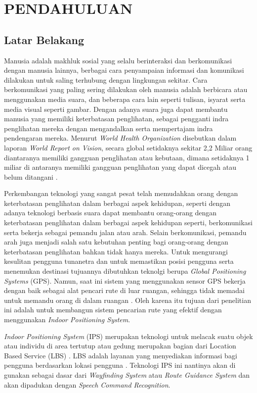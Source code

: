 \fancyhf{} 
\fancyfoot[R]{\thepage}

\chapter{PENDAHULUAN}

\section{Latar Belakang}
Manusia adalah makhluk sosial yang selalu berinteraksi dan berkomunikasi dengan manusia lainnya, berbagai cara penyampaian informasi dan komunikasi dilakukan untuk saling terhubung dengan lingkungan sekitar. Cara berkomunikasi yang paling sering dilakukan oleh manusia adalah berbicara atau menggunakan media suara, dan beberapa cara lain seperti tulisan, isyarat serta media visual seperti gambar. Dengan adanya suara juga dapat membantu manusia yang memiliki keterbatasan penglihatan, sebagai pengganti indra penglihatan mereka dengan mengandalkan serta mempertajam indra pendengaran mereka. Menurut \textit{World Health Organization} disebutkan dalam laporan \textit{World Report on Vision}, secara global setidaknya sekitar 2,2 Miliar orang diantaranya memiliki gangguan penglihatan atau kebutaan, dimana setidaknya 1 miliar di antaranya memiliki gangguan penglihatan yang dapat dicegah atau belum ditangani \citep{who2019}. 

Perkembangan teknologi yang sangat pesat telah memudahkan orang dengan keterbatasan penglihatan dalam berbagai aspek kehidupan, seperti dengan adanya teknologi berbasis suara dapat membantu orang-orang dengan keterbatasan penglihatan dalam berbagai aspek kehidupan seperti, berkomunikasi serta bekerja sebagai pemandu jalan atau arah. Selain berkomunikasi, pemandu arah juga menjadi salah satu kebutuhan penting bagi orang-orang dengan keterbatasan penglihatan bahkan tidak hanya mereka. 
Untuk mengurangi kesulitan pengguna tunanetra dan untuk memastikan posisi pengguna serta menemukan destinasi tujuannya dibutuhkan teknolgi berupa \textit{Global Positioning Systems} (GPS). Namun, saat ini sistem yang menggunakan sensor GPS bekerja dengan baik sebagai alat pencari rute di luar ruangan, sehingga tidak memadai untuk memandu orang di dalam ruangan \citep{ko2017vision}. Oleh karena itu tujuan dari penelitian ini adalah untuk membangun sistem pencarian rute yang efektif dengan menggunakan \textit{Indoor Positioning System}.

\par \textit{Indoor Positioning System} (IPS) merupakan teknologi untuk melacak suatu objek atau individu di area tertutup atau gedung merupakan bagian dari Location Based Service (LBS) \citep{brena2017evolution}. LBS adalah layanan yang menyediakan informasi bagi pengguna berdasarkan lokasi pengguna \citep{rawat2018smart}. Teknologi IPS ini nantinya akan di gunakan sebagai dasar dari \textit{Wayfinding System} atau \textit{Route Guidance System} dan akan dipadukan dengan \textit{Speech Command Recognition}.

